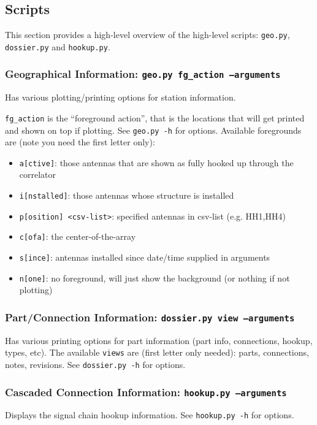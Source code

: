 \documentclass{article}
\begin{document}
\subsection{Scripts}
\label{sec:scripts}
This section provides a high-level overview of the high-level scripts:  {\tt geo.py},  {\tt dossier.py} and {\tt hookup.py}.

\subsubsection{Geographical Information:  {\tt geo.py fg\_action --arguments}}

Has various plotting/printing options for station information.  {{\tt fg\_action} is the ``foreground action'', that is the locations that will get printed and shown on top if plotting.
See {\tt geo.py -h} for options.
Available foregrounds are (note you need the first letter only):
\begin{itemize}\setlength\itemsep{-.3em}
\item {\tt a[ctive]}:  those antennas that are shown as fully hooked up through the correlator
\item {\tt i[nstalled]}:  those antennas whose structure is installed
\item {\tt p[osition] <csv-list>}:  specified antennas in csv-list (e.g. HH1,HH4)
\item {\tt c[ofa]}:  the center-of-the-array
\item {\tt s[ince]}:  antennas installed since date/time supplied in arguments
\item {\tt n[one]}:  no foreground, will just show the background (or nothing if not plotting)
\end{itemize}


\subsubsection{Part/Connection Information: {\tt dossier.py view --arguments}}
Has various printing options for part information (part info, connections, hookup, types, etc).
The available {\tt views} are (first letter only needed):  parts, connections, notes, revisions.
See {\tt dossier.py -h} for options.

\subsubsection{Cascaded Connection Information:  {\tt hookup.py --arguments}}
Displays the signal chain hookup information.  See {\tt hookup.py -h} for options.

}
\end{document}
